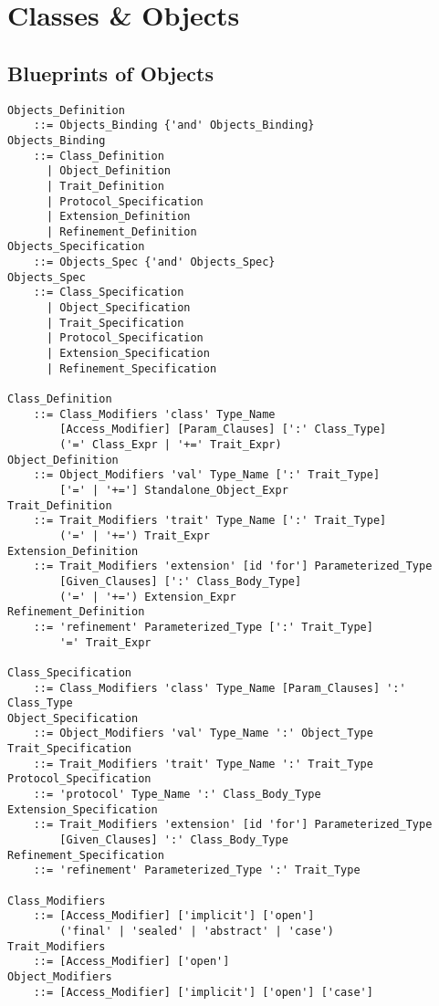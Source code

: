 
\chapter{Classes \& Objects}

\minitoc

\newpage

\section{Blueprints of Objects}
\label{sec:blueprints-objects}

\grammar\begin{lstlisting}
Objects_Definition
    ::= Objects_Binding {'and' Objects_Binding}
Objects_Binding
    ::= Class_Definition
      | Object_Definition
      | Trait_Definition
      | Protocol_Specification
      | Extension_Definition
      | Refinement_Definition
Objects_Specification
    ::= Objects_Spec {'and' Objects_Spec}
Objects_Spec
    ::= Class_Specification
      | Object_Specification
      | Trait_Specification
      | Protocol_Specification
      | Extension_Specification
      | Refinement_Specification

Class_Definition
    ::= Class_Modifiers 'class' Type_Name 
        [Access_Modifier] [Param_Clauses] [':' Class_Type]
        ('=' Class_Expr | '+=' Trait_Expr)
Object_Definition 
    ::= Object_Modifiers 'val' Type_Name [':' Trait_Type]
        ['=' | '+='] Standalone_Object_Expr
Trait_Definition 
    ::= Trait_Modifiers 'trait' Type_Name [':' Trait_Type]
        ('=' | '+=') Trait_Expr
Extension_Definition
    ::= Trait_Modifiers 'extension' [id 'for'] Parameterized_Type
        [Given_Clauses] [':' Class_Body_Type]
        ('=' | '+=') Extension_Expr
Refinement_Definition
    ::= 'refinement' Parameterized_Type [':' Trait_Type]
        '=' Trait_Expr

Class_Specification
    ::= Class_Modifiers 'class' Type_Name [Param_Clauses] ':' Class_Type
Object_Specification
    ::= Object_Modifiers 'val' Type_Name ':' Object_Type
Trait_Specification
    ::= Trait_Modifiers 'trait' Type_Name ':' Trait_Type
Protocol_Specification
    ::= 'protocol' Type_Name ':' Class_Body_Type
Extension_Specification
    ::= Trait_Modifiers 'extension' [id 'for'] Parameterized_Type 
        [Given_Clauses] ':' Class_Body_Type
Refinement_Specification
    ::= 'refinement' Parameterized_Type ':' Trait_Type
    
Class_Modifiers
    ::= [Access_Modifier] ['implicit'] ['open'] 
        ('final' | 'sealed' | 'abstract' | 'case')
Trait_Modifiers
    ::= [Access_Modifier] ['open']
Object_Modifiers
    ::= [Access_Modifier] ['implicit'] ['open'] ['case']  
\end{lstlisting}







